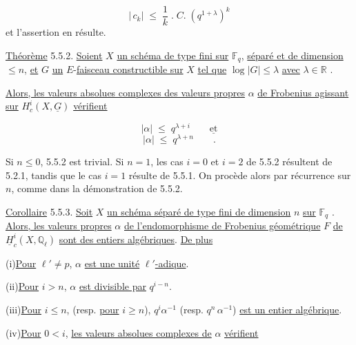 \begin{equation*}
\left| \, c_k \right| \;\leqslant\; \frac{1}{k} \;.\; C. \; (q^{1+\lambda})^k
\end{equation*}
et l'assertion en résulte.

\underline{Théorème} 5.5.2. \underline{Soient} $X$ \underline{un schéma de type fini sur} $\mathbb{F}_q$, \underline{séparé et de dimension} $\leqslant n$, \underline{et} $G$ \underline{un} $E$-\underline{faisceau constructible sur} $X$ \underline{tel que} $\log|G| \leqslant \lambda$ \underline{avec} $\lambda \in \mathbb{R}$ .

\underline{Alors, les valeurs absolues complexes des valeurs propres} $\alpha$ \underline{de Frobenius agissant sur} $H^i_c(X,\underline{G})$ \underline{vérifient}

\begin{equation*}
|\alpha| \;\leqslant\; q^{\lambda+i} \qquad \underline{\mbox{et}}
\end{equation*}
\begin{equation*}
|\alpha| \;\leqslant\; q^{\lambda+n} \qquad .
\end{equation*}


Si $n \leq 0$, 5.5.2 est trivial. Si $n = 1$, les cas $i = 0$ et $i = 2$ de 5.5.2 résultent de 5.2.1, tandis que le cas $i = 1$ résulte de 5.5.1. On procède alors par récurrence sur $n$, comme dans la démonstration de 5.5.2.

\underline{Corollaire} 5.5.3. \underline{Soit} $X$ \underline{un schéma séparé de type fini de dimension} $n$ \underline{sur} $\mathbb{F}_q$ . \underline{Alors, les valeurs propres} $\alpha$ \underline{de l'endomorphisme de Frobenius géométrique} $F$ \underline{de} $\underline{H}^i_c(X,\mathbb{Q}_\ell)$ \underline{sont des entiers algébriques}. \underline{De plus}

(i)\quad \underline{Pour} $\ell' \neq p$, $\alpha$ \underline{est une unité} $\ell'$\underline{-adique}.

(ii)\quad \underline{Pour} $i > n$, $\alpha$ \underline{est divisible par} $q^{i-n}$.

(iii)\quad \underline{Pour} $i \leq n$, (resp. \underline{pour} $i \geq n$), $q^i \alpha^{-1}$ (resp. $q^n \, \alpha^{-1}$) \underline{est un entier algébrique}.

(iv)\quad \underline{Pour} $0 < i$, \underline{les valeurs absolues complexes de} $\alpha$ \underline{vérifient}

